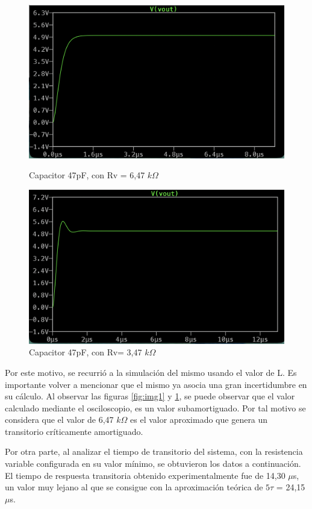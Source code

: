 \documentclass{article}
\begin{document}
        \begin{figure}[h!]
    \centering
    \begin{minipage}{0.49\textwidth}
        \centering
        \includegraphics[width=\linewidth]{CRIT2.png}
        \caption{Capacitor 47pF, con Rv = 6,47 $k\Omega$}
        \label{fig:img1}
    \end{minipage}\hfill
    \begin{minipage}{0.49\textwidth}
        \centering
        \includegraphics[width=\linewidth]{SUBAMORT1.png}
        \caption{Capacitor 47pF, con Rv= 3,47 $k\Omega$}
        \label{fig:img2}
    \end{minipage}
\end{figure}

        Por este motivo, se recurrió a la simulación del mismo usando el valor de L. Es importante volver a mencionar que el mismo ya asocia una gran incertidumbre en su cálculo. Al observar las figuras \ref{fig:img1} y \ref{fig:img2}, se puede observar que el valor calculado mediante el osciloscopio, es un valor subamortiguado. Por tal motivo se considera que el valor de 6,47 $k\Omega$ es el valor aproximado que genera un transitorio críticamente amortiguado.\par
        Por otra parte, al analizar el tiempo de transitorio del sistema, con la resistencia variable configurada en su valor mínimo, se obtuvieron los datos a continuación. El tiempo de respuesta transitoria obtenido experimentalmente fue de 14,30 $\mu$s, un valor muy lejano al que se consigue con la aproximación teórica de $5\tau$ = 24,15 $\mu$s. \par
        
\end{document}
